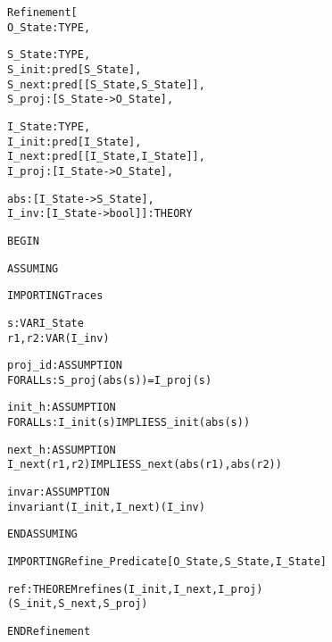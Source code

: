 \newpage
\begin{alltt}
%%%%%%%%%%%%%%%%%%%%%%%%%%%%%%%%%%%%%%%%%%%%%%%%%%%%%%%%%%%%%%
% Refinement :                                               %
%   The lemma ``ref'' states that the implementation refines %
%   the specification conditioned the assumptions.           %
%%%%%%%%%%%%%%%%%%%%%%%%%%%%%%%%%%%%%%%%%%%%%%%%%%%%%%%%%%%%%%

Refinement[
  O_State : TYPE,

  S_State : TYPE,
  S_init  : pred[S_State],
  S_next  : pred[[S_State,S_State]],
  S_proj  : [S_State -> O_State],

  I_State : TYPE,
  I_init  : pred[I_State],
  I_next  : pred[[I_State,I_State]],
  I_proj  : [I_State -> O_State],

  abs     : [I_State -> S_State],
  I_inv   : [I_State -> bool]] : THEORY

BEGIN

  ASSUMING

    IMPORTING Traces

    s     : VAR I_State
    r1,r2 : VAR (I_inv)

    proj_id : ASSUMPTION
      FORALL s: S_proj(abs(s)) = I_proj(s)

    init_h : ASSUMPTION 
      FORALL s: I_init(s) IMPLIES S_init(abs(s))

    next_h : ASSUMPTION 
      I_next(r1,r2) IMPLIES S_next(abs(r1),abs(r2))

    invar : ASSUMPTION
      invariant(I_init,I_next)(I_inv)

  ENDASSUMING

  IMPORTING Refine_Predicate[O_State,S_State,I_State]

  ref : THEOREM refines(I_init,I_next,I_proj)
                       (S_init,S_next,S_proj)

END Refinement
\end{alltt}


